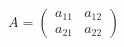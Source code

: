 \documentclass{article}
\begin{document}
\begin{equation}
  A = \begin{pmatrix}
    a_{11} & a_{12} \\
    a_{21} & a_{22}
  \end{pmatrix}
\end{equation}
\end{document}
